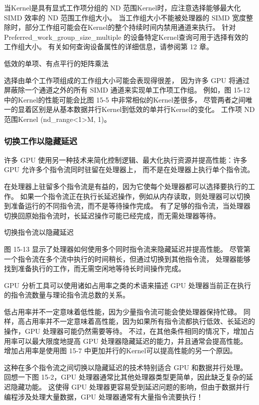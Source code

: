 当Kernel是具有显式工作项分组的 ND 范围Kernel时，应注意选择能够最大化 SIMD 效率的 ND 范围工作组大小。 
当工作组大小不能被处理器的 SIMD 宽度整除时，部分工作组可能会在Kernel的整个持续时间内禁用通道来执行。 
针对 Preferred\_work\_group\_size\_multiple 的设备特定Kernel查询可用于选择有效的工作组大小。 
有关如何查询设备属性的详细信息，请参阅第 12 章。

{\color{red} 低效的单项、有点平行的矩阵乘法}

选择由单个工作项组成的工作组大小可能会表现得很差，
因为许多 GPU 将通过屏蔽除一个通道之外的所有 SIMD 通道来实现单工作项工作组。 
例如，图 15-12 中的Kernel的性能可能会比图 15-5 中非常相似的Kernel差很多，
尽管两者之间唯一的显着区别是从基本数据并行Kernel到低效的单并行Kernel的变化。 
工作项 ND 范围Kernel (nd\_range<1>{M, 1})。

\subsubsection{切换工作以隐藏延迟}
许多 GPU 使用另一种技术来简化控制逻辑、最大化执行资源并提高性能：许多 GPU 允许多个指令流同时驻留在处理器上，
而不是在处理器上执行单个指令流。

在处理器上驻留多个指令流是有益的，因为它使每个处理器都可以选择要执行的工作。 
如果一个指令流正在执行长延迟操作，例如从内存读取，则处理器可以切换到准备运行的不同指令流，而不是等待操作完成。 
有了足够的指令流，当处理器切换回原始指令流时，长延迟操作可能已经完成，而无需处理器等待。

{\color{red} 切换指令流以隐藏延迟}

图 15-13 显示了处理器如何使用多个同时指令流来隐藏延迟并提高性能。 
尽管第一个指令流在多个流中执行的时间稍长，但通过切换到其他指令流，
处理器能够找到准备执行的工作，而无需空闲地等待长时间操作完成。

GPU 分析工具可以使用诸如占用率之类的术语来描述 GPU 处理器当前正在执行的指令流数量与理论指令流总数的关系。

低占用率并不一定意味着低性能，因为少量指令流可能会使处理器保持忙碌。 
同样，高占用率并不一定意味着高性能，因为如果所有指令流都执行低效、长延迟的操作，GPU 处理器可能仍然需要等待。 
不过，在其他条件相同的情况下，增加占用率可以最大限度地提高 GPU 处理器隐藏延迟的能力，并且通常会提高性能。 
增加占用率是使用图 15-7 中更加并行的Kernel可以提高性能的另一个原因。

这种在多个指令流之间切换以隐藏延迟的技术特别适合 GPU 和数据并行处理。 
回想一下图 15-2，GPU 处理器通常比其他处理器类型更简单，因此缺乏复杂的延迟隐藏功能。 
这使得 GPU 处理器更容易受到延迟问题的影响，但由于数据并行编程涉及处理大量数据，GPU 处理器通常有大量指令流要执行！

